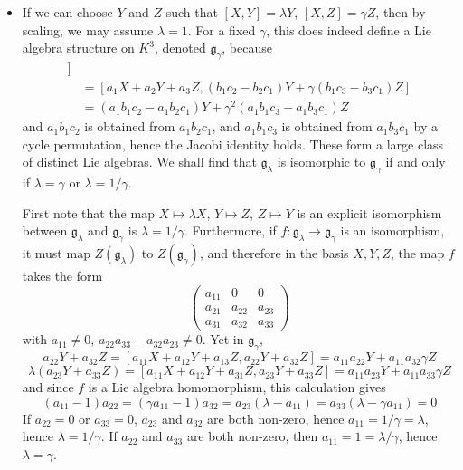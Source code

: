 \begin{itemize}
    \item If we can choose $Y$ and $Z$ such that $[X,Y] = \lambda Y$, $[X,Z] = \gamma Z$, then by scaling, we may assume $\lambda = 1$. For a fixed $\gamma$, this does indeed define a Lie algebra structure on $K^3$, denoted $\mathfrak{g}_\gamma$, because
    \begin{align*}
        [a_1X + a_2Y& + a_3Z, [b_1X + b_2Y + b_3Z, c_1X + c_2Y + c_3Z]]\\
        &= [a_1X + a_2Y + a_3Z, (b_1c_2 - b_2c_1) Y + \gamma (b_1 c_3 - b_3c_1) Z]\\
        &= (a_1b_1c_2 - a_1 b_2c_1) Y + \gamma^2 (a_1 b_1c_3 - a_1 b_3 c_1) Z
    \end{align*}
    and $a_1b_1c_2$ is obtained from $a_1b_2c_1$, and $a_1b_1c_3$ is obtained from $a_1b_3c_1$ by a cycle permutation, hence the Jacobi identity holds. These form a large class of distinct Lie algebras. We shall find that $\mathfrak{g}_\lambda$ is isomorphic to $\mathfrak{g}_\gamma$ if and only if $\lambda = \gamma$ or $\lambda = 1/\gamma$.

    First note that the map $X \mapsto \lambda X$, $Y \mapsto Z$, $Z \mapsto Y$ is an explicit isomorphism between $\mathfrak{g}_\lambda$ and $\mathfrak{g}_\gamma$ is $\lambda = 1/\gamma$. Furthermore, if $f: \mathfrak{g}_\lambda \to \mathfrak{g}_\gamma$ is an isomorphism, it must map $Z(\mathfrak{g}_\lambda)$ to $Z(\mathfrak{g}_\gamma)$, and therefore in the basis $X,Y,Z$, the map $f$ takes the form
    \[ \begin{pmatrix} a_{11} & 0 & 0 \\ a_{21} & a_{22} & a_{23} \\ a_{31} & a_{32} & a_{33} \end{pmatrix} \]
    with $a_{11} \neq 0$, $a_{22} a_{33} - a_{32} a_{23} \neq 0$. Yet in $\mathfrak{g}_\gamma$,
    \[ a_{22}Y + a_{32}Z = [a_{11}X + a_{12}Y + a_{13}Z, a_{22}Y + a_{32}Z] = a_{11}a_{22}Y + a_{11}a_{32} \gamma Z \]
    \[ \lambda (a_{23}Y + a_{33}Z) = [a_{11}X + a_{12}Y + a_{31}Z, a_{23}Y + a_{33}Z] = a_{11}a_{23}Y + a_{11}a_{33} \gamma Z \]
    and since $f$ is a Lie algebra homomorphism, this calculation gives
    \[ (a_{11} - 1)a_{22} = (\gamma a_{11} - 1) a_{32} = a_{23}(\lambda - a_{11}) = a_{33}(\lambda - \gamma a_{11}) = 0 \]
    If $a_{22} = 0$ or $a_{33} = 0$, $a_{23}$ and $a_{32}$ are both non-zero, hence $a_{11} = 1/\gamma = \lambda$, hence $\lambda = 1/\gamma$. If $a_{22}$ and $a_{33}$ are both non-zero, then $a_{11} = 1 = \lambda/\gamma$, hence $\lambda = \gamma$.


\end{itemize}
